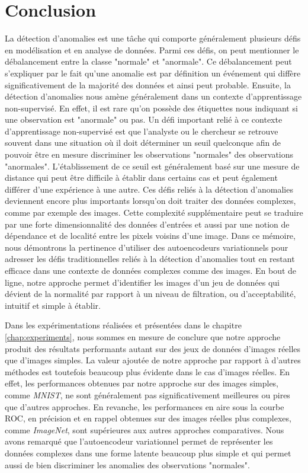 \chapter*{Conclusion}           %
\label{chap:conclusion}         %

La détection d'anomalies est une tâche qui comporte généralement plusieurs défis en modélisation et en analyse de données. Parmi ces défis, on peut mentionner le débalancement entre la classe "normale" et "anormale". Ce débalancement peut s'expliquer par le fait qu'une anomalie est par définition un événement qui diffère significativement de la majorité des données \citep{Zimek2017} et ainsi peut probable. Ensuite, la détection d'anomalies nous amène généralement dans un contexte d'apprentissage non-supervisé. En effet, il est rare qu'on possède des étiquettes nous indiquant si une observation est "anormale" ou pas. Un défi important relié à ce contexte d'apprentissage non-supervisé est que l'analyste ou le chercheur se retrouve souvent dans une situation où il doit déterminer un seuil quelconque afin de pouvoir être en mesure discriminer les observations "normales" des observations "anormales". L'établissement de ce seuil est généralement basé sur une mesure de distance qui peut être difficile à établir dans certains cas et peut également différer d'une expérience à une autre. Ces défis reliés à la détection d'anomalies deviennent encore plus importants lorsqu'on doit traiter des données complexes, comme par exemple des images. Cette complexité supplémentaire peut se traduire par une forte dimensionnalité des données d'entrées et aussi par une notion de dépendance et de localité entre les pixels voisins d'une image.  Dans ce mémoire, nous démontrons la pertinence d'utiliser des autoencodeurs variationnels pour adresser les défis traditionnelles reliés à la détection d'anomalies tout en restant efficace dans une contexte de données complexes comme des images. En bout de ligne, notre approche permet d'identifier les images d'un jeu de données qui dévient de la normalité par rapport à un niveau de filtration, ou d'acceptabilité, intuitif et simple à établir.

Dans les expérimentations réalisées et présentées dans le chapitre \ref{chap:experiments}, nous sommes en mesure de conclure que notre approche produit des résultats performants autant sur des jeux de données d'images réelles que d'images simples. La valeur ajoutée de notre approche par rapport à d'autres méthodes est toutefois beaucoup plus évidente dans le cas d'images réelles. En effet, les performances obtenues par notre approche sur des images simples, comme \textit{MNIST}, ne sont généralement pas significativement meilleures ou pires que d'autres approches. En revanche, les performances en aire sous la courbe ROC, en précision et en rappel obtenues sur des images réelles plus complexes, comme \textit{ImageNet}, sont supérieures aux autres approches comparatives. Nous avons remarqué que l'autoencodeur variationnel permet de représenter les données complexes dans une forme latente beaucoup plus simple et qui permet aussi de bien discriminer les anomalies des observations "normales". 

